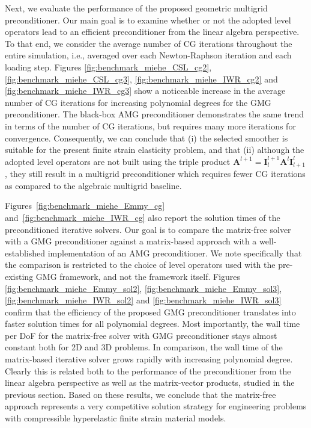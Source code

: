 \documentclass[AMA,STIX1COL]{WileyNJD-v2}
\newcommand*{\gz}[1]{\boldsymbol{#1}}
\begin{document}
Next, we evaluate the performance of the proposed geometric multigrid preconditioner.
Our main goal is to examine whether or not the adopted level operators lead to an efficient preconditioner from the linear algebra perspective. To that end,
we consider the average number of CG iterations throughout the entire simulation, i.e., averaged over each Newton-Raphson iteration and each loading step.
Figures \ref{fig:benchmark_miehe_CSL_cg2}, \ref{fig:benchmark_miehe_CSL_cg3}, \ref{fig:benchmark_miehe_IWR_cg2} and \ref{fig:benchmark_miehe_IWR_cg3} show a
 noticeable increase in the average number of CG iterations for increasing polynomial degrees
 for the GMG preconditioner.
The black-box AMG preconditioner
demonstrates the same trend in terms of the number of CG iterations, but
requires many more iterations for convergence.
Consequently, we can conclude that (i) the selected smoother is suitable for the present finite strain elasticity problem, and that
(ii) although the adopted level operators are not built using the triple product $\gz A^{l+1}=\gz I^{l+1}_{l} \gz A^l \gz I^l_{l+1}$,
they still result in a multigrid preconditioner which requires fewer CG iterations as compared to the algebraic multigrid baseline.

Figures~\ref{fig:benchmark_miehe_Emmy_cg} and~\ref{fig:benchmark_miehe_IWR_cg} also report the solution times of the preconditioned iterative solvers.
Our goal is to compare the matrix-free solver with a GMG preconditioner against a matrix-based approach with a well-established implementation of an AMG preconditioner.
We note specifically that the comparison is restricted to the choice of level operators used with the pre-existing GMG framework, and not the framework itself.
Figures \ref{fig:benchmark_miehe_Emmy_sol2}, \ref{fig:benchmark_miehe_Emmy_sol3}, \ref{fig:benchmark_miehe_IWR_sol2} and \ref{fig:benchmark_miehe_IWR_sol3}
confirm that the efficiency of the proposed GMG preconditioner translates into faster solution times for all polynomial degrees.
Most importantly, the wall time per DoF for the matrix-free solver with GMG preconditioner stays almost constant both for 2D and 3D problems.
In comparison, the wall time of the matrix-based iterative solver grows rapidly with increasing polynomial degree.
Clearly this is related both to the performance of the preconditioner from the linear algebra perspective as well as the matrix-vector products,
studied in the previous section.
Based on these results, we conclude that the matrix-free approach represents a very competitive solution strategy for engineering problems
with compressible hyperelastic finite strain material models.
\end{document}
